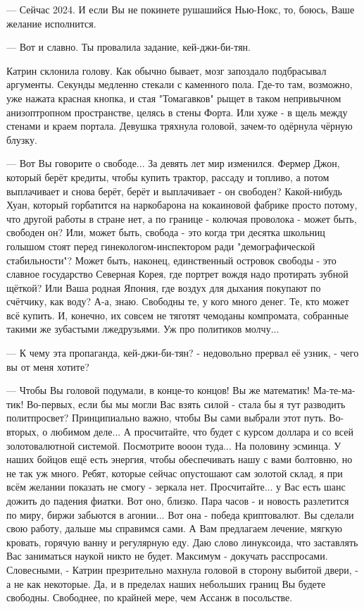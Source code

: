 --- Сейчас 2024. И если Вы не покинете рушашийся Нью-Нокс, то, боюсь, Ваше желание исполнится.

--- Вот и славно. Ты провалила задание, кей-джи-би-тян.

Катрин склонила голову. Как обычно бывает, мозг запоздало подбрасывал аргументы. Секунды медленно стекали с каменного пола.
Где-то там, возможно, уже нажата красная кнопка, и стая "Томагавков" рыщет в таком непривычном анизоптропном пространстве, целясь в стены Форта. Или хуже - в щель между стенами и краем портала. Девушка тряхнула головой, зачем-то одёрнула чёрную блузку.

--- Вот Вы говорите о свободе... За девять лет мир изменился. Фермер Джон, который берёт кредиты, чтобы купить трактор, рассаду и топливо, а потом выплачивает и снова берёт, берёт и выплачивает - он свободен? Какой-нибудь Хуан, который горбатится на наркобарона на кокаиновой фабрике просто потому, что другой работы в стране нет, а по границе - колючая проволока - может быть, свободен он? Или, может быть, свобода - это когда три десятка школьниц голышом стоят перед гинекологом-инспектором ради "демографической стабильности"? Может быть, наконец, единственный островок свободы - это славное государство Северная Корея, где портрет вождя надо протирать зубной щёткой? Или Ваша родная Япония, где воздух для дыхания покупают по счётчику, как воду? А-а, знаю. Свободны те, у кого много денег. Те, кто может всё купить. И, конечно, их совсем не тяготят чемоданы компромата, собранные такими же зубастыми лжедрузьями. Уж про политиков молчу...

--- К чему эта пропаганда, кей-джи-би-тян? - недовольно прервал её узник, - чего вы от меня хотите?

--- Чтобы Вы головой подумали, в конце-то концов! Вы же математик! Ма-те-ма-тик! Во-первых, если бы мы могли Вас взять силой - стала бы я тут разводить политпросвет? Принципиально важно, чтобы Вы сами выбрали этот путь. Во-вторых, о любимом деле... А просчитайте, что будет с курсом доллара и со всей золотовалютной системой. Посмотрите вооон туда... На половину эсминца. У наших бойцов ещё есть энергия, чтобы обеспечивать нашу с вами болтовню, но не так уж много. Ребят, которые сейчас опустошают сам золотой склад, я при всём желании показать не смогу - зеркала нет. Просчитайте... у Вас есть шанс дожить до падения фиатки. Вот оно, близко. Пара часов - и новость разлетится по миру, биржи забьются в агонии... Вот она - победа криптовалют. Вы сделали свою работу, дальше мы справимся сами. А Вам предлагаем лечение, мягкую кровать, горячую ванну и регулярную еду. Даю слово линуксоида, что заставлять Вас заниматься наукой никто не будет. Максимум - докучать расспросами. Словесными, - Катрин презрительно махнула головой в сторону выбитой двери, - а не как некоторые. Да, и в пределах наших небольших границ Вы будете свободны. Свободнее, по крайней мере, чем Ассанж в посольстве.

